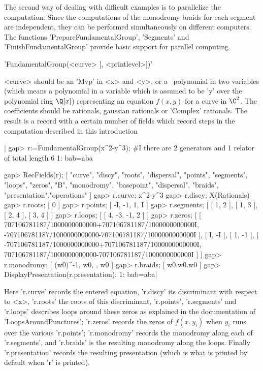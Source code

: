 The second way of dealing with  difficult examples is to parallelize the
computation. Since  the computations  of the  monodromy braids  for each
segment  are  independent,  they  can  be  performed  simultaneously  on
different computers. The functions 'PrepareFundamentalGroup', 'Segments'
and   'FinishFundamentalGroup'  provide   basic  support   for  parallel
computing.


'FundamentalGroup(<curve> [, <printlevel>])'

<curve> should be an 'Mvp' in <x>  and <y>, or a \GAP\ polynomial in two
variables (which means a polynomial in a variable which is assumed to be
'y' over the polynomial ring $\Q[x]$) representing an equation $f(x,y)$
for a curve  in $\C^2$. The coefficients should  be rationals, gaussian
rationals or 'Complex' rationals. The result  is a record with a certain
number of fields which record steps in the computation described in this
introduction\:

|    gap> r:=FundamentalGroup(x^2-y^3);
    #I  there are 2 generators and 1 relator of total length 6
    1: bab=aba
    
    gap> RecFields(r);
    [ "curve", "discy", "roots", "dispersal", "points", "segments", "loops",
      "zeros", "B", "monodromy", "basepoint", "dispersal", "braids", 
      "presentation","operations" ]
    gap> r.curve;
    x^2-y^3
    gap> r.discy;
    X(Rationals)
    gap> r.roots;
    [ 0 ]
    gap> r.points;
    [ -I, -1, 1, I ]
    gap> r.segments;
    [ [ 1, 2 ], [ 1, 3 ], [ 2, 4 ], [ 3, 4 ] ]
    gap> r.loops;
    [ [ 4, -3, -1, 2 ] ]
    gap> r.zeros;
    [ [ 707106781187/1000000000000+707106781187/1000000000000I,
       -707106781187/1000000000000-707106781187/1000000000000I ],
      [ I, -I ], [ 1, -1 ],
      [ -707106781187/1000000000000+707106781187/1000000000000I,
      707106781187/1000000000000-707106781187/1000000000000I ] ]
    gap> r.monodromy;
    [ (w0)^-1, w0, , w0 ]
    gap> r.braids;
    [ w0.w0.w0 ]
    gap> DisplayPresentation(r.presentation);
    1: bab=aba|

Here 'r.curve' records the  entered equation, 'r.discy' its discriminant
with  respect  to  <x>,  'r.roots'   the  roots  of  this  discriminant,
'r.points',  'r.segments' and  'r.loops'  describes  loops around  these
zeros  as  explained  in   the  documentation  of  'LoopsAroundPunctures';
'r.zeros'  records the  zeros of  $f(x,y_i)$  when $y_i$  runs over  the
various 'r.points';  'r.monodromy' records  the monodromy along  each of
'r.segments', and 'r.braids' is the resulting monodromy along the loops.
Finally 'r.presentation'  records the  resulting presentation  (which is
what is printed by default when 'r' is printed).

